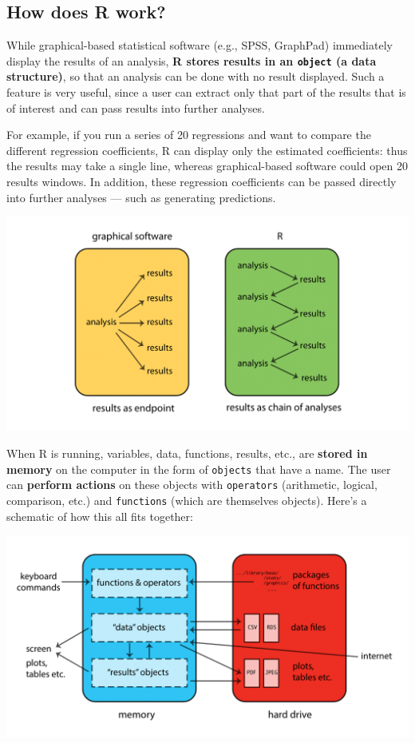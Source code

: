 \documentclass[]{book}
\begin{document}
\hypertarget{how-does-r-work}{%
\subsection{How does R work?}\label{how-does-r-work}}

While graphical-based statistical software (e.g., SPSS, GraphPad) immediately display
the results of an analysis, \textbf{R stores results in an \texttt{object} (a data structure)},
so that an analysis can be done with no result displayed. Such a feature is very
useful, since a user can extract only that part of the results that is of interest
and can pass results into further analyses.

For example, if you run a series of 20 regressions and want to compare the
different regression coefficients, R can display only the estimated coefficients:
thus the results may take a single line, whereas graphical-based software could
open 20 results windows. In addition, these regression coefficients can be passed
directly into further analyses --- such as generating predictions.

\includegraphics{R/Rintro/images/R_chain.png}

When R is running, variables, data, functions, results, etc., are \textbf{stored in memory}
on the computer in the form of \texttt{objects} that have a name. The user can
\textbf{perform actions} on these objects with \texttt{operators} (arithmetic, logical,
comparison, etc.) and \texttt{functions} (which are themselves objects). Here's a
schematic of how this all fits together:

\includegraphics{R/Rintro/images/R_works.png}
\end{document}
